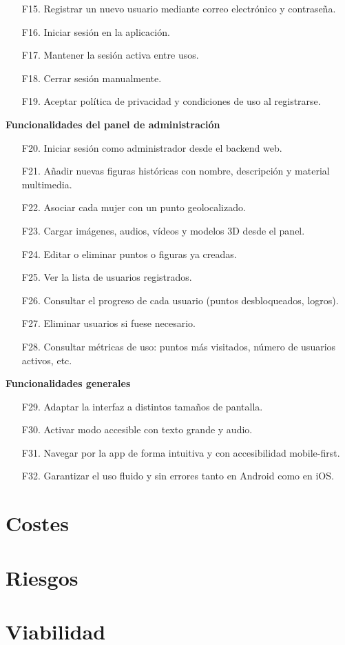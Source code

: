 \begin{itemize}
    \item[F15.] Registrar un nuevo usuario mediante correo electrónico y contraseña.
    \item[F16.] Iniciar sesión en la aplicación.
    \item[F17.] Mantener la sesión activa entre usos.
    \item[F18.] Cerrar sesión manualmente.
    \item[F19.] Aceptar política de privacidad y condiciones de uso al registrarse.
\end{itemize}

\textbf{\textsf{\large Funcionalidades del panel de administración}}

\begin{itemize}
    \item[F20.] Iniciar sesión como administrador desde el backend web.
    \item[F21.] Añadir nuevas figuras históricas con nombre, descripción y material multimedia.
    \item[F22.] Asociar cada mujer con un punto geolocalizado.
    \item[F23.] Cargar imágenes, audios, vídeos y modelos 3D desde el panel.
    \item[F24.] Editar o eliminar puntos o figuras ya creadas.
    \item[F25.] Ver la lista de usuarios registrados.
    \item[F26.] Consultar el progreso de cada usuario (puntos desbloqueados, logros).
    \item[F27.] Eliminar usuarios si fuese necesario.
    \item[F28.] Consultar métricas de uso: puntos más visitados, número de usuarios activos, etc.
\end{itemize}

\textbf{\textsf{\large Funcionalidades generales}}

\begin{itemize}
    \item[F29.] Adaptar la interfaz a distintos tamaños de pantalla.
    \item[F30.] Activar modo accesible con texto grande y audio.
    \item[F31.] Navegar por la app de forma intuitiva y con accesibilidad mobile-first.
    \item[F32.] Garantizar el uso fluido y sin errores tanto en Android como en iOS.
\end{itemize}

\section{Costes}

\section{Riesgos}

\section{Viabilidad}


